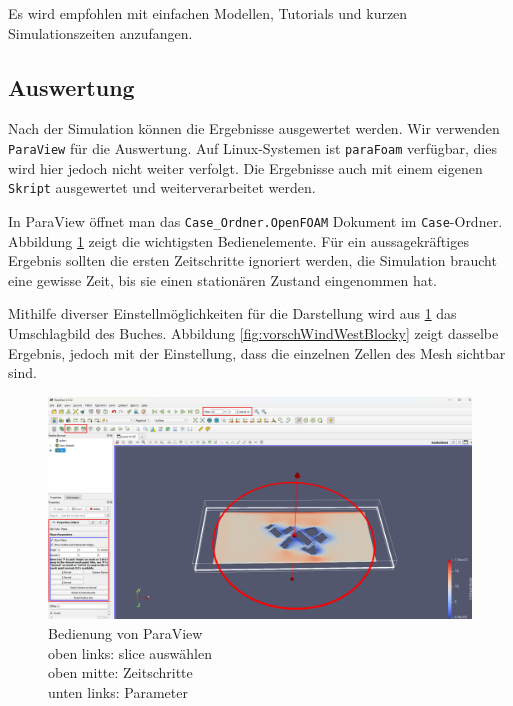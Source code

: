 Es wird empfohlen mit einfachen Modellen, Tutorials und kurzen Simulationszeiten anzufangen.

\subsection{Auswertung \label{openfoam:section:Auswertung}}
Nach der Simulation können die Ergebnisse ausgewertet werden. 
Wir verwenden \texttt{ParaView} für die Auswertung. 
Auf Linux-Systemen ist \texttt{paraFoam} verfügbar, dies wird hier jedoch nicht weiter verfolgt.
Die Ergebnisse auch mit einem eigenen \texttt{Skript} ausgewertet und weiterverarbeitet werden.

In ParaView öffnet man das \texttt{Case\_Ordner.OpenFOAM} Dokument im \texttt{Case}-Ordner.
Abbildung \ref{fig:Beispiel_Paraview} zeigt die wichtigsten Bedienelemente.
Für ein aussagekräftiges Ergebnis sollten die ersten Zeitschritte ignoriert werden, die Simulation braucht eine gewisse Zeit, bis sie einen stationären Zustand eingenommen hat.

Mithilfe diverser Einstellmöglichkeiten für die Darstellung wird aus \ref{fig:Beispiel_Paraview} das Umschlagbild des Buches.
Abbildung \ref{fig:vorschWindWestBlocky} zeigt dasselbe Ergebnis, jedoch mit der Einstellung, dass die einzelnen Zellen des Mesh sichtbar sind.

\begin{figure}
    \centering
    \includegraphics[width=1\textwidth]{papers/openfoam/Bilder/Beispiel_Paraview.png}
    \caption{Bedienung von ParaView\\ oben links: slice auswählen\\ oben mitte: Zeitschritte\\ unten links: Parameter}
    \label{fig:Beispiel_Paraview}
\end{figure}

